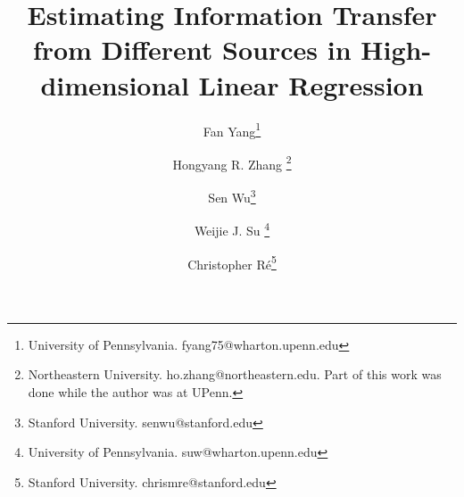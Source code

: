 \documentclass{article}
\begin{document}
	\title{Estimating Information Transfer from Different Sources in High-dimensional Linear Regression}
	
    \author{Fan Yang\thanks{University of Pennsylvania. fyang75@wharton.upenn.edu}\and Hongyang R. Zhang \thanks{Northeastern University. ho.zhang@northeastern.edu. Part of this work was done while the author was at UPenn.}\and Sen Wu\thanks{Stanford University. senwu@stanford.edu}\and Weijie J. Su \thanks{University of Pennsylvania. suw@wharton.upenn.edu}\and Christopher R\'e\thanks{Stanford University. chrismre@stanford.edu}}	

	\maketitle
	
	
	
	
	
    
	
	
	
\end{document}
